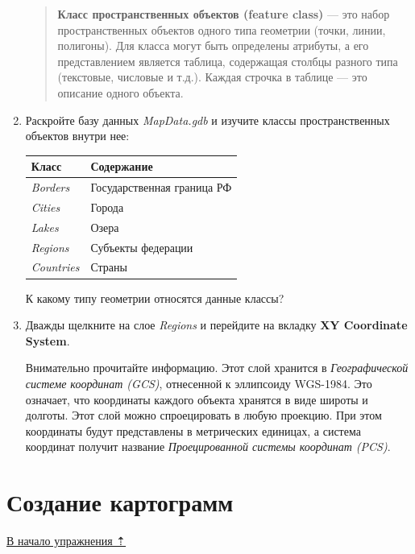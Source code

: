\documentclass[12pt,]{book}
\begin{document}
\begin{enumerate}
  \begin{quote}
  \textbf{Класс пространственных объектов (feature class)} --- это набор пространственных объектов одного типа геометрии (точки, линии, полигоны). Для класса могут быть определены атрибуты, а его представлением является таблица, содержащая столбцы разного типа (текстовые, числовые и т.д.). Каждая строчка в таблице --- это описание одного объекта.
  \end{quote}
\item
  Раскройте базу данных \emph{MapData.gdb} и изучите классы пространственных объектов внутри нее:

  \begin{longtable}[]{@{}ll@{}}
  \toprule
  \textbf{Класс} & \textbf{Содержание}\tabularnewline
  \midrule
  \endhead
  \emph{Borders} & Государственная граница РФ\tabularnewline
  \emph{Cities} & Города\tabularnewline
  \emph{Lakes} & Озера\tabularnewline
  \emph{Regions} & Субъекты федерации\tabularnewline
  \emph{Countries} & Страны\tabularnewline
  \bottomrule
  \end{longtable}

  К какому типу геометрии относятся данные классы?
\item
  Дважды щелкните на слое \emph{Regions} и перейдите на вкладку \textbf{XY Coordinate System}.

  Внимательно прочитайте информацию. Этот слой хранится в \emph{Географической системе координат (GCS)}, отнесенной к эллипсоиду WGS-1984. Это означает, что координаты каждого объекта хранятся в виде широты и долготы. Этот слой можно спроецировать в любую проекцию. При этом координаты будут представлены в метрических единицах, а система координат получит название \emph{Проецированной системы координат (PCS)}.
\end{enumerate}

\hypertarget{map-design-economic-choropleth}{%
\section{Создание картограмм}\label{map-design-economic-choropleth}}

\protect\hyperlink{map-design-economic}{В начало упражнения ⇡}
\end{document}

